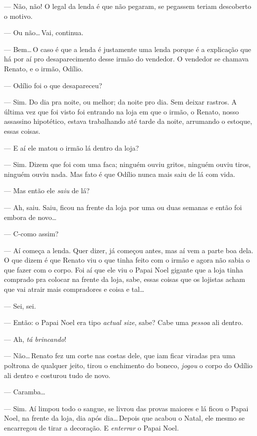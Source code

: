 --- Não, não! O legal da lenda é que não pegaram, se pegassem teriam descoberto o motivo.

--- Ou não\ldots\,Vai, continua.

--- Bem\ldots\,O caso é que a lenda é justamente uma lenda porque é a explicação que há por aí pro desaparecimento desse irmão do vendedor. O vendedor se chamava Renato, e o irmão, Odílio.

--- Odílio foi o que desapareceu?

--- Sim. Do dia pra noite, ou melhor; da noite pro dia. Sem deixar rastros. A última vez que foi visto foi entrando na loja em que o irmão, o Renato, nosso assassino hipotético, estava trabalhando até tarde da noite, arrumando o estoque, essas coisas.

--- E aí ele matou o irmão lá dentro da loja?

--- Sim. Dizem que foi com uma faca; ninguém ouviu gritos, ninguém ouviu tiros, ninguém ouviu nada. Mas fato é que Odílio nunca mais saiu de lá com vida.

--- Mas então ele \emph{saiu} de lá?

--- Ah, saiu. Saiu, ficou na frente da loja por uma ou duas semanas e então foi embora de novo\ldots

--- C-como assim?

--- Aí começa a lenda. Quer dizer, já começou antes, mas aí vem a parte boa dela. O que dizem é que Renato viu o que tinha feito com o irmão e agora não sabia o que fazer com o corpo. Foi aí que ele viu o Papai Noel gigante que a loja tinha comprado pra colocar na frente da loja, sabe, essas coisas que os lojistas acham que vai atrair mais compradores e coisa e tal\ldots

--- Sei, sei.

--- Então: o Papai Noel era tipo \foreignlanguage{english}{\emph{actual size}}, sabe? Cabe uma \emph{pessoa} ali dentro.

--- Ah, \emph{tá brincando}!

--- Não\ldots\,Renato fez um corte nas costas dele, que iam ficar viradas pra uma poltrona de qualquer jeito, tirou o enchimento do boneco, \emph{jogou} o corpo do Odílio ali dentro e costurou tudo de novo.

--- Caramba\ldots

--- Sim. Aí limpou todo o sangue, se livrou das provas maiores e lá ficou o Papai Noel, na frente da loja, dia após dia\ldots\,Depois que acabou o Natal, ele mesmo se encarregou de tirar a decoração. E \emph{enterrar} o Papai Noel.

